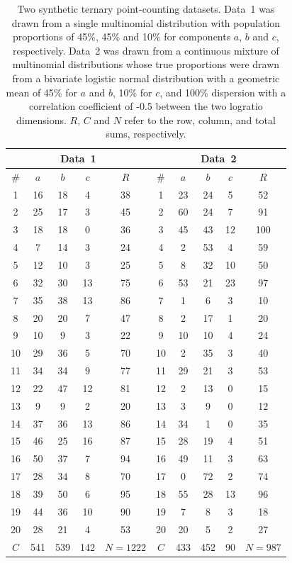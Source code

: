 \documentclass{article}
\begin{document}
\begin{table}[!ht]
  \centering
  \begin{tabular}{c|ccc|c||c|ccc|c}
\multicolumn{5}{c||}{Data~1} & \multicolumn{5}{c}{Data~2} \\ \hline
\#& $a$& $b$& $c$& $R$& \#& $a$& $b$& $c$& $R$ \\ \hline
1& 16& 18& 4& 38& 1& 23& 24& 5& 52 \\
2& 25& 17& 3& 45& 2& 60& 24& 7& 91 \\
3& 18& 18& 0& 36& 3& 45& 43& 12& 100 \\
4& 7& 14& 3& 24& 4& 2& 53& 4& 59 \\
5& 12& 10& 3& 25& 5& 8& 32& 10& 50 \\
6& 32& 30& 13& 75& 6& 53& 21& 23& 97 \\
7& 35& 38& 13& 86& 7& 1& 6& 3& 10 \\
8& 20& 20& 7& 47& 8& 2& 17& 1& 20 \\
9& 10& 9& 3& 22& 9& 10& 10& 4& 24 \\
10& 29& 36& 5& 70& 10& 2& 35& 3& 40 \\
11& 34& 34& 9& 77& 11& 29& 21& 3& 53 \\
12& 22& 47& 12& 81& 12& 2& 13& 0& 15 \\
13& 9& 9& 2& 20& 13& 3& 9& 0& 12 \\
14& 37& 36& 13& 86& 14& 34& 1& 0& 35 \\
15& 46& 25& 16& 87& 15& 28& 19& 4& 51 \\
16& 50& 37& 7& 94& 16& 49& 11& 3& 63 \\
17& 28& 34& 8& 70& 17& 0& 72& 2& 74 \\
18& 39& 50& 6& 95& 18& 55& 28& 13& 96 \\
19& 44& 36& 10& 90& 19& 7& 8& 3& 18 \\
20& 28& 21& 4& 53& 20& 20& 5& 2& 27 \\
\hline
$C$& 541& 539& 142& $N=1222$& $C$& 433& 452& 90& $N=987$
  \end{tabular}
  \label{tab:data}
  \caption{Two synthetic ternary point-counting datasets.  Data~1 was
    drawn from a single multinomial distribution with population
    proportions of 45\%, 45\% and 10\% for components $a$, $b$ and
    $c$, respectively. Data~2 was drawn from a continuous mixture of
    multinomial distributions whose true proportions were drawn from a
    bivariate logistic normal distribution with a geometric mean of
    45\% for $a$ and $b$, 10\% for $c$, and 100\% dispersion with a
    correlation coefficient of -0.5 between the two logratio
    dimensions. $R$, $C$ and $N$ refer to the row, column, and total
    sums, respectively.}
\end{table}
\end{document}
